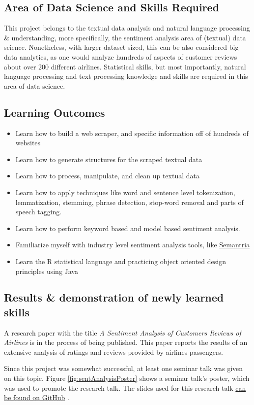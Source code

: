 \documentclass[12pt]{article} %
\begin{document}
\subsection{Area of Data Science and Skills Required} %
This project belongs to the textual data analysis and natural language processing \& understanding, more specifically, the sentiment analysis area of (textual) data science. Nonetheless, with larger dataset sized, this can be also considered big data analytics, as one would analyze hundreds of aspects of customer reviews about over 200 different airlines.
Statistical skills, but most importantly, natural language processing and text processing knowledge and skills are required in this area of data science.
\subsection{Learning Outcomes} %
  \begin{itemize}
    \item Learn how to build a web scraper, and specific information off of hundreds of websites
    \item Learn how to generate structures for the scraped textual data
    \item Learn how to process, manipulate, and clean up textual data
    \item Learn how to apply techniques like word and sentence level tokenization, lemmatization, stemming, phrase detection, stop-word removal and parts of speech tagging.
    \item Learn how to perform keyword based and model based sentiment analysis.
    \item Familiarize myself with industry level sentiment analysis tools, like \href{https://www.lexalytics.com/semantria/excel}{Semantria}
    \item Learn the R statistical language and practicing object oriented design principles using Java
  \end{itemize}
\subsection{Results \& demonstration of newly learned skills} %
A research paper with the title \textit{A Sentiment Analysis of Customers Reviews of Airlines} is in the process of being published. This paper reports the results of an extensive analysis of ratings and reviews provided by airlines passengers.

Since this project was somewhat successful, at least one seminar talk was given on this topic. Figure \ref{fig:sentAnalysisPoster} shows a seminar talk's poster, which was used to promote the research talk. The slides used for this research talk \href{https://github.com/norberte/DataCollector/blob/master/docs/Sentiment\%20Analysis_Talk_slides.pdf}{can be found on GitHub} \cite{sentAnalysisDocs}.
\end{document}
